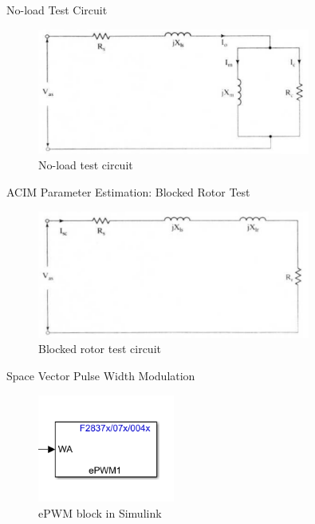 \begin{frame}{No-load Test Circuit}
	\begin{figure}
		\centering
		\includegraphics[width=0.8\textwidth]{sections/section5/images/ParamEstim/noloadCircuitKrish.png}
		\caption{No-load test circuit}
	\end{figure}
\end{frame}

\begin{frame}{ACIM Parameter Estimation: Blocked Rotor Test}
	\begin{figure}
		\centering
		\includegraphics[width=0.8\textwidth]{sections/section5/images/ParamEstim/blockedCircuitKrish.png}
		\caption{Blocked rotor test circuit}
	\end{figure}
\end{frame}

\begin{frame}{Space Vector Pulse Width Modulation}
	\begin{figure}
		\centering
		\includegraphics[width=0.4\textwidth]{sections/section6/images/SVPWM/ePWMBlock.png}
		\caption{ePWM block in Simulink}
	\end{figure}
\end{frame}

